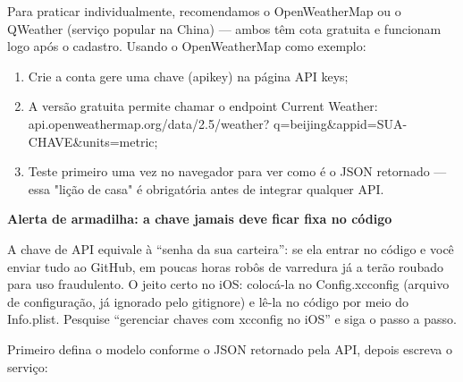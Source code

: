 


Para praticar individualmente, recomendamos o OpenWeatherMap ou o QWeather (serviço popular na China) — ambos têm cota gratuita e funcionam logo após o cadastro. Usando o OpenWeatherMap como exemplo:

\begin{enumerate}
  \item Crie a conta gere uma chave (apikey) na página API keys;
  \item A versão gratuita permite chamar o endpoint Current Weather: api.openweathermap.org/data/2.5/weather? q=beijing\&appid=SUA-CHAVE\&units=metric;
  \item Teste primeiro uma vez no navegador para ver como é o JSON retornado — essa "lição de casa" é obrigatória antes de integrar qualquer API.
\end{enumerate}

\textbf{Alerta de armadilha: a chave jamais deve ficar fixa no código}\par

A chave de API equivale à “senha da sua carteira”: se ela entrar no código e você enviar tudo ao GitHub, em poucas horas robôs de varredura já a terão roubado para uso fraudulento. O jeito certo no iOS: colocá-la no Config.xcconfig (arquivo de configuração, já ignorado pelo gitignore) e lê-la no código por meio do Info.plist. Pesquise “gerenciar chaves com xcconfig no iOS” e siga o passo a passo.


Primeiro defina o modelo conforme o JSON retornado pela API, depois escreva o serviço:

